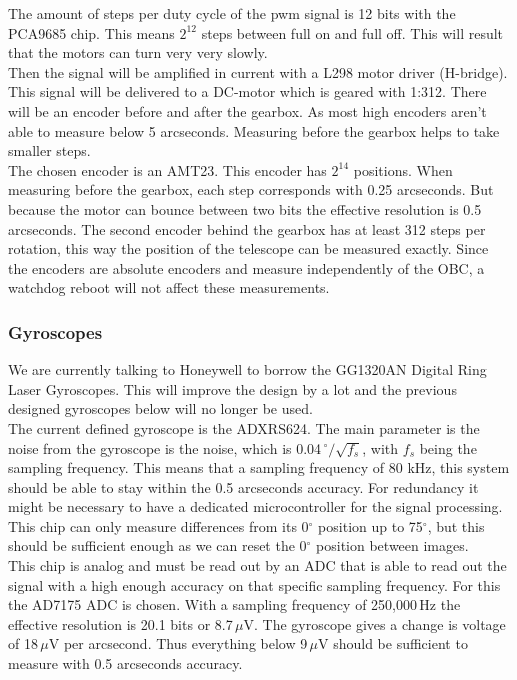 The amount of steps per duty cycle of the pwm signal is 12 bits with the PCA9685 chip. This means $2^{12}$ steps between full on and full off. This will result that the motors can turn very very slowly.\\

Then the signal will be amplified in current with a L298 motor driver (H-bridge). This signal will be delivered to a DC-motor which is geared with 1:312. There will be an encoder before and after the gearbox. As most high encoders aren't able to measure below 5 arcseconds. Measuring before the gearbox helps to take smaller steps.\\

The chosen encoder is an AMT23. This encoder has $2^{14}$ positions. When measuring before the gearbox, each step corresponds with 0.25 arcseconds. But because the motor can bounce between two bits the effective resolution is 0.5 arcseconds. The second encoder behind the gearbox has at least 312 steps per rotation, this way the position of the telescope can be measured exactly. Since the encoders are absolute encoders and measure independently of the OBC, a watchdog reboot will not affect these measurements.


\subsubsection{Gyroscopes}
We are currently talking to Honeywell to borrow the GG1320AN Digital Ring Laser Gyroscopes. This will improve the design by a lot and the previous designed gyroscopes below will no longer be used.\\

The current defined gyroscope is the ADXRS624. The main parameter is the noise from the gyroscope is the noise, which is 0.04\,$^\circ/ \sqrt{f_s}$, with $f_s$ being the sampling frequency. This means that a sampling frequency of 80 kHz, this system should be able to stay within the 0.5 arcseconds accuracy. For redundancy it might be necessary to have a dedicated microcontroller for the signal processing. This chip can only measure differences from its 0$^\circ$ position up to 75$^\circ$, but this should be sufficient enough as we can reset the 0$^\circ$ position between images.\\

This chip is analog and must be read out by an ADC that is able to read out the signal with a high enough accuracy on that specific sampling frequency. For this the AD7175 ADC is chosen. With a sampling frequency of 250,000\,Hz the effective resolution is 20.1 bits or 8.7\,$\mu$V. The gyroscope gives a change is voltage of 18\,$\mu$V per arcsecond. Thus everything below 9\,$\mu$V should be sufficient to measure with 0.5 arcseconds accuracy.


